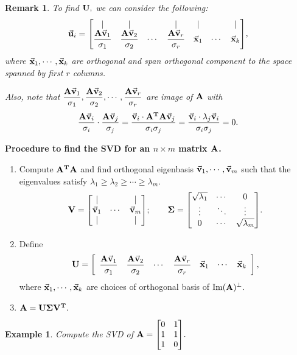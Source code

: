 \documentclass[12pt, a4paper]{article}
\newtheorem{eg}{Example}[subsection]
\newtheorem*{rmk}{\indent Remark}
\def\T{{\vb{T}}}
\def\vecx{\va{x}}
\def\vecv{\va{v}}
\def\vecu{\va{u}}
\def\matrixA{\vb{A}}
\def\matrixU{\vb{U}}
\def\matrixV{\vb{V}}
\def\matrixSig{\vb{\Sigma}}
\def\dsst{\displaystyle}
\begin{document}
\begin{rmk}
	To find $\matrixU,$ we can consider the following: \[\vecu_i=\mqty[|&|&&|&|&&|\\\dfrac{\matrixA\vecv_1}{\sigma_1}&\dfrac{\matrixA\vecv_2}{\sigma_2}&\cdots&\dfrac{\matrixA\vecv_r}{\sigma_r}&\vecx_1&\cdots&\vecx_k],\]	where $\vecx_1,\cdots,\vecx_k$ are orthogonal and span orthogonal component to the space spanned by first $r$ columns.\par Also, note that $\dsst\dfrac{\matrixA\vecv_1}{\sigma_1},\dfrac{\matrixA\vecv_2}{\sigma_2},\cdots,\dfrac{\matrixA\vecv_r}{\sigma_r}$ are image of $\matrixA$ with \[\dfrac{\matrixA\vecv_i}{\sigma_i}\cdot\dfrac{\matrixA\vecv_j}{\sigma_j}=\dfrac{\vecv_i\cdot\matrixA^\T\matrixA\vecv_j}{\sigma_i\sigma_j}=\dfrac{\vecv_i\cdot\lambda_j\vecv_i}{\sigma_i\sigma_j}=0.\]
\end{rmk}
\begin{framed}
\textbf{Procedure to find the SVD for an $n\times m$ matrix $\matrixA$.}
\begin{enumerate}
	\item Compute $\matrixA^\T\matrixA$ and find orthogonal eigenbasis $\vecv_1,\cdots,\vecv_m$ such that the eigenvalues satisfy $\lambda_1\geq\lambda_2\geq\cdots\geq\lambda_m$. \[\matrixV=\mqty[|&&|\\\vecv_1&\cdots&\vecv_m\\|&&|];\qquad\matrixSig=\mqty[\sqrt{\lambda_1}&\cdots&0\\\vdots&\ddots&\vdots\\0&\cdots&\sqrt{\lambda_m}].\]
	\item Define \[\matrixU=\left[\begin{array}{cc}\mqty{\dfrac{\matrixA\vecv_1}{\sigma_1}&\dfrac{\matrixA\vecv_2}{\sigma_2}&\cdots&\dfrac{\matrixA\vecv_r}{\sigma_r}}&\mqty{\vecx_1&\cdots&\vecx_k}\end{array}\right],\] where $\vecx_1,\cdots,\vecx_k$ are choices of orthogonal basis of $\Im(\matrixA)^\perp.$
	\item $\matrixA=\matrixU\matrixSig\matrixV^\T.$
\end{enumerate}	
\end{framed}
\begin{eg}
	Compute the SVD of $\matrixA=\mqty[0&1\\1&1\\1&0].$	
\end{eg}
\end{document}
